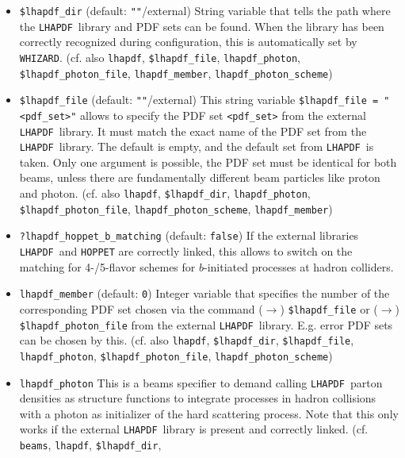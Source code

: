 \documentclass[12pt]{book}
\newcommand{\ttt}[1]{\texttt{#1}}
\newcommand{\whizard}{\texttt{WHIZARD}}
\newcommand{\lhapdf}{\texttt{LHAPDF}}
\begin{document}
\begin{itemize}
\item
\ttt{\$lhapdf\_dir} \qquad (default: \ttt{""}/external) \newline
String variable that tells the path where the \lhapdf\ library and PDF
sets can be found. When the library has been correctly recognized
during configuration, this is automatically set by \whizard. (cf. also
\ttt{lhapdf}, \ttt{\$lhapdf\_file}, \ttt{lhapdf\_photon},
\ttt{\$lhapdf\_photon\_file}, \ttt{lhapdf\_member},
\ttt{lhapdf\_photon\_scheme}) 
\item
\ttt{\$lhapdf\_file} \qquad (default: \ttt{""}/external) \newline
This string variable \ttt{\$lhapdf\_file = "<pdf\_set>"} allows to
specify the PDF set \ttt{<pdf\_set>} from the external \lhapdf\
library. It must match the exact name of the PDF set
from the \lhapdf\ library. The default is empty, and the default set
from \lhapdf\ is taken. Only one argument is possible, the PDF set
must be identical for both beams, unless there are fundamentally
different beam particles like proton and photon. (cf. also
\ttt{lhapdf}, \ttt{\$lhapdf\_dir}, \ttt{lhapdf\_photon},
\ttt{\$lhapdf\_photon\_file}, \ttt{lhapdf\_photon\_scheme},
\ttt{lhapdf\_member}) 
\item
\ttt{?lhapdf\_hoppet\_b\_matching} \qquad (default: \ttt{false})
\newline
If the external libraries \lhapdf\ and \ttt{HOPPET} are correctly
linked, this allows to switch on the matching for 4-/5-flavor schemes
for $b$-initiated processes at hadron colliders.
\item
\ttt{lhapdf\_member} \qquad (default: \ttt{0}) \newline
Integer variable that specifies the number of the corresponding PDF
set chosen via the command ($\to$) \ttt{\$lhapdf\_file} or ($\to$)
\ttt{\$lhapdf\_photon\_file} from the external \lhapdf\
library. E.g. error PDF sets can be chosen by this. (cf. also
\ttt{lhapdf}, \ttt{\$lhapdf\_dir}, \ttt{\$lhapdf\_file},
\ttt{lhapdf\_photon}, \ttt{\$lhapdf\_photon\_file},
\ttt{lhapdf\_photon\_scheme}) 
\item
\ttt{lhapdf\_photon} \newline
This is a beams specifier to demand calling \lhapdf\ parton densities as
structure functions to integrate processes in hadron collisions with a
photon as initializer of the hard scattering process. Note
that this only works if the external \lhapdf\ library is present and
correctly linked. (cf. \ttt{beams}, \ttt{lhapdf}, \ttt{\$lhapdf\_dir},

\end{itemize}
\end{document}
